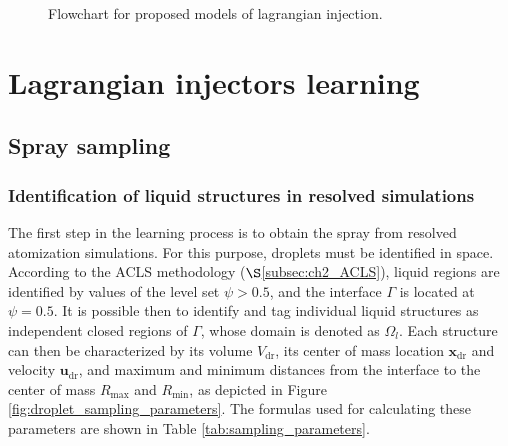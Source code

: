 \begin{figure}[h!]	
	\centering
	\caption{Flowchart for proposed models of lagrangian injection.}
	\label{fig:SLI_flowchart}
\end{figure}





\section{Lagrangian injectors learning}
	\label{sec:ch4_SLI_learning}


\subsection{Spray sampling}
\label{subsec:SLI_spray_sampling}

\subsubsection*{Identification of liquid structures in resolved simulations}

The first step in the learning process is to obtain the spray from resolved atomization simulations. For this purpose, droplets must be identified in space. According to the ACLS methodology ($\S$\ref{subsec:ch2_ACLS}), liquid regions are identified by values of the level set $\psi > 0.5$, and the interface $\Gamma$ is located at $\psi = 0.5$. It is possible then to identify and tag individual liquid structures as independent closed regions of $\Gamma$, whose domain is denoted as $\Omega_l$. Each structure can then be characterized by its volume $V_\mathrm{dr}$, its center of mass location $\textbf{x}_\mathrm{dr}$ and velocity $\textbf{u}_\mathrm{dr}$, and maximum and minimum distances from the interface to the center of mass $R_\mathrm{max}$ and $R_\mathrm{min}$, as depicted in Figure \ref{fig:droplet_sampling_parameters}. The formulas used for calculating these parameters are shown in Table \ref{tab:sampling_parameters}. 

